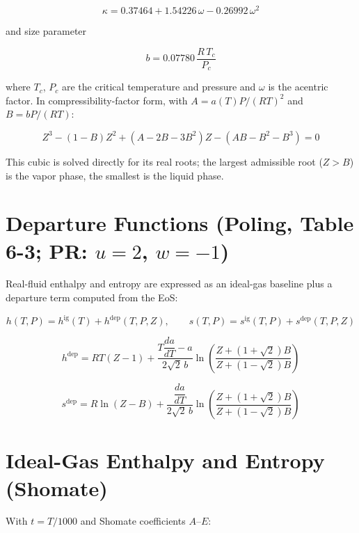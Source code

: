 \documentclass[11pt]{article}
\begin{document}
\begin{equation}
\kappa = 0.37464 + 1.54226\,\omega - 0.26992\,\omega^2
\end{equation}

and size parameter

\begin{equation}
b = 0.07780\,\frac{R\,T_c}{P_c}
\end{equation}

where $T_c$, $P_c$ are the critical temperature and pressure and $\omega$ is
the acentric factor. In compressibility-factor form, with
$A = a(T)P/(RT)^2$ and $B = bP/(RT)$:

\begin{equation}
Z^3 - (1-B)Z^2 + \left(A - 2B - 3B^2\right)Z - \left(AB - B^2 - B^3\right) = 0
\end{equation}

This cubic is solved directly for its real roots; the largest admissible
root ($Z > B$) is the vapor phase, the smallest is the liquid phase.

\section{Departure Functions (Poling, Table 6-3; PR: $u=2$, $w=-1$)}

Real-fluid enthalpy and entropy are expressed as an ideal-gas baseline plus
a departure term computed from the EoS:

\begin{equation}
h(T,P) = h^{\text{ig}}(T) + h^{\text{dep}}(T,P,Z), \qquad
s(T,P) = s^{\text{ig}}(T,P) + s^{\text{dep}}(T,P,Z)
\end{equation}

\begin{equation}
h^{\text{dep}} = RT(Z-1) + \frac{T\dfrac{da}{dT} - a}{2\sqrt{2}\,b}
\ln\!\left(\frac{Z+(1+\sqrt{2})B}{Z+(1-\sqrt{2})B}\right)
\end{equation}

\begin{equation}
s^{\text{dep}} = R\ln(Z-B) + \frac{\dfrac{da}{dT}}{2\sqrt{2}\,b}
\ln\!\left(\frac{Z+(1+\sqrt{2})B}{Z+(1-\sqrt{2})B}\right)
\end{equation}

\section{Ideal-Gas Enthalpy and Entropy (Shomate)}

With $t = T/1000$ and Shomate coefficients $A$--$E$:
\end{document}
